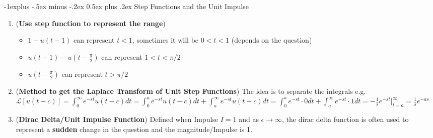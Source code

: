 \documentclass[10pt, landscape]{article}
\makeatletter
\renewcommand{\subsection}{\@startsection{subsection}{2}{0mm}%
                                {-1explus -.5ex minus -.2ex}%
                                {0.5ex plus .2ex}%
                                {\normalfont\normalsize\bfseries}}
\makeatother
\begin{document}
\begin{multicols}{4}
\subsection{Step Functions and the Unit Impulse}
\begin{enumerate}
    \item (\textbf{Use step function to represent the range})
    \begin{itemize}
        \item $1-u(t-1)$ can represent $t<1$, sometimes it will be $0<t<1$ (depends on the question)
        \item $u(t-1)-u(t-\frac{\pi}{2})$ can represent $1<t<\pi/2$
        \item $u(t-\frac{\pi}{2})$ can represent $t>\pi/2$
    \end{itemize}
    \item (\textbf{Method to get the Laplace Transform of Unit Step Functions}) The idea is to separate the integrals
    e.g. $\mathcal{L}[u(t-c)]=\int_0^\infty e^{-st}u(t-c)dt=\int_0^ae^{-st}u(t-c)dt+\int_a^\infty e^{-st}u(t-c)dt=\int_0^ae^{-st}\cdot0dt+\int_a^\infty e^{-st}\cdot1dt=-\frac{1}{s}e^{-st}|_{t=a}^\infty=\frac{1}{s}e^{-as}$
    \item (\textbf{Dirac Delta/Unit Impulse Function}) Defined when Impulse $I=1$ and as $\epsilon\to\infty$, the dirac delta function is often used to represent a \textbf{sudden} change in the question and the magnitude/Impulse is 1.
\end{enumerate}


\end{multicols}
\end{document}
